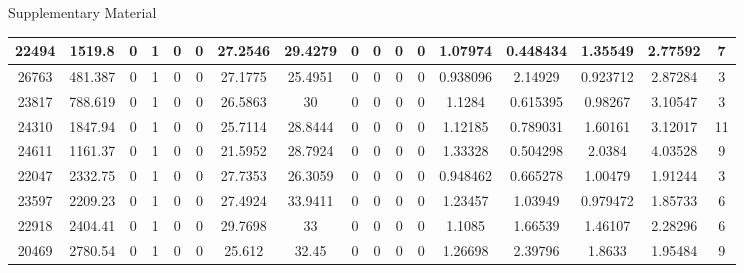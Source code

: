 \begin{wcfChaps}{Supplementary Material}
\begin{sidewaystable}
{\begin{tabular}{|c|c|c|c|c|c|c|c|c|c|c|c|c|c|c|c|c|}
22494 & 1519.8 & 0 & 1 & 0 & 0 & 27.2546 & 29.4279 & 0 & 0 & 0 & 0 & 1.07974 & 0.448434 & 1.35549 & 2.77592 & 7 \\\hline
26763 & 481.387 & 0 & 1 & 0 & 0 & 27.1775 & 25.4951 & 0 & 0 & 0 & 0 & 0.938096 & 2.14929 & 0.923712 & 2.87284 & 3 \\\hline
23817 & 788.619 & 0 & 1 & 0 & 0 & 26.5863 & 30 & 0 & 0 & 0 & 0 & 1.1284 & 0.615395 & 0.98267 & 3.10547 & 3 \\\hline
24310 & 1847.94 & 0 & 1 & 0 & 0 & 25.7114 & 28.8444 & 0 & 0 & 0 & 0 & 1.12185 & 0.789031 & 1.60161 & 3.12017 & 11 \\\hline
24611 & 1161.37 & 0 & 1 & 0 & 0 & 21.5952 & 28.7924 & 0 & 0 & 0 & 0 & 1.33328 & 0.504298 & 2.0384 & 4.03528 & 9 \\\hline
22047 & 2332.75 & 0 & 1 & 0 & 0 & 27.7353 & 26.3059 & 0 & 0 & 0 & 0 & 0.948462 & 0.665278 & 1.00479 & 1.91244 & 3 \\\hline
23597 & 2209.23 & 0 & 1 & 0 & 0 & 27.4924 & 33.9411 & 0 & 0 & 0 & 0 & 1.23457 & 1.03949 & 0.979472 & 1.85733 & 6 \\\hline
22918 & 2404.41 & 0 & 1 & 0 & 0 & 29.7698 & 33 & 0 & 0 & 0 & 0 & 1.1085 & 1.66539 & 1.46107 & 2.28296 & 6 \\\hline
20469 & 2780.54 & 0 & 1 & 0 & 0 & 25.612 & 32.45 & 0 & 0 & 0 & 0 & 1.26698 & 2.39796 & 1.8633 & 1.95484 & 9 \\\hline


\end{tabular}}
\end{sidewaystable}
\end{wcfChaps}
